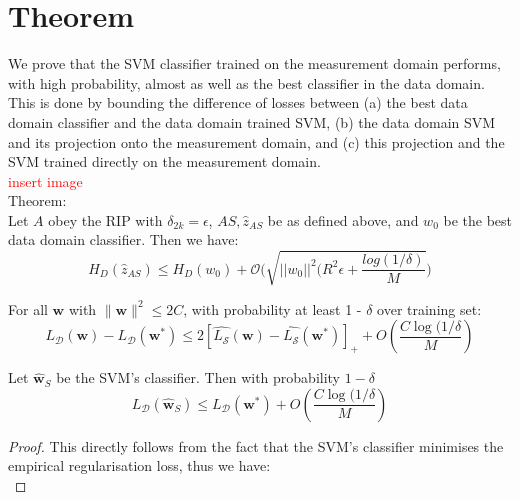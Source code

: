 \documentclass[12pt]{article}
\begin{document}
{\section{Theorem}
We prove that the SVM classifier trained on the measurement domain performs, with high probability, almost as well as the best classifier in the data domain. This is done by bounding the difference of losses between (a) the best data domain classifier and the data domain trained SVM, (b) the data domain SVM and its projection onto the measurement domain, and (c) this projection and the SVM trained directly on the measurement domain.\\
\textcolor{red}{insert image}\\

Theorem:\\
Let $A$ obey the RIP with $\delta_{2k} = \epsilon$, $AS, \hat{z}_{AS}$ be as defined above, and $w_0$ be the best data domain classifier. Then we have:
\[ H_D(\hat{z}_{AS}) \leq H_D(w_0) + \mathcal{O}\Bigg(\sqrt{||w_0||^2\bigg(R^2 \epsilon + \frac{log(1/\delta)}{M}}\Bigg) \]


\newpage

\begin{theorem}
For all $\boldsymbol{w}$ with $\lVert \boldsymbol{w} \rVert^2 \leq 2C$, with probability at least 1 - $\delta$ over training set:
\begin{equation}
    L_{\mathcal{D}}(\boldsymbol{w}) - L_{\mathcal{D}}(\boldsymbol{w^*})\leq 2[\hat{L_{\mathcal{S}}}(\boldsymbol{w}) - \hat{L_{\mathcal{S}}}(\boldsymbol{w^*})]_+ + O\left(\dfrac{C\log(1/ \delta}{M}\right)
\end{equation}
\end{theorem}

\begin{corollary}
Let $\hat{\boldsymbol{w}}_S$ be the SVM's classifier. Then with probability $1 - \delta$
\[ L_{\mathcal{D}}(\hat{\boldsymbol{w}}_S) \leq L_{\mathcal{D}}(\boldsymbol{w^*}) + O\left(\dfrac{C\log(1/ \delta}{M}\right)\]
\end{corollary}

\begin{proof}
This directly follows from the fact that the SVM's classifier minimises the empirical regularisation loss, thus we have:
\[ \]
\end{proof}

}
\end{document}
